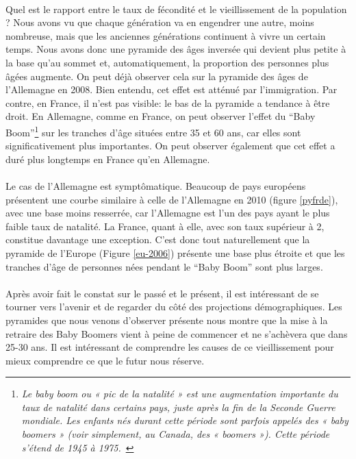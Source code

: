 \paragraph{}Quel est le rapport entre le taux de fécondité et le vieillissement de la population ? Nous avons vu que chaque génération va en engendrer une autre, moins nombreuse, mais que les anciennes générations continuent à vivre un certain temps. Nous avons donc une pyramide des âges inversée qui devient plus petite à la base qu’au sommet et, automatiquement, la proportion des personnes plus âgées augmente. On peut déjà observer cela sur la pyramide des âges de l’Allemagne en 2008. Bien entendu, cet effet est atténué par l’immigration. Par contre, en France, il n’est pas visible: le bas de la pyramide a tendance à être droit.  En Allemagne, comme en France, on peut observer l’effet du “Baby Boom”\footnote{\textit{Le baby boom ou « pic de la natalité » est une augmentation importante du taux de natalité dans certains pays, juste après la fin de la Seconde Guerre mondiale. Les enfants nés durant cette période sont parfois appelés des « baby boomers » (voir simplement, au Canada, des « boomers »). Cette période s'étend de 1945 à 1975.}~\citep{baby-boom}} sur les tranches d'âge situées entre 35 et 60 ans, car elles sont significativement plus importantes. On peut observer également que cet effet a duré plus longtemps en France qu'en Allemagne.

\paragraph{}Le cas de l’Allemagne est symptômatique. Beaucoup de pays européens présentent une courbe similaire à celle de l’Allemagne en 2010 (figure \ref{pyfrde}), avec une base moins resserrée, car l’Allemagne est l'un des pays ayant le plus faible taux de natalité. La France, quant à elle, avec son taux supérieur à 2, constitue davantage une exception. C’est donc tout naturellement que la pyramide de l’Europe (Figure \ref{eu-2006}) présente une base plus étroite et que les tranches d'âge de personnes nées pendant le “Baby Boom” sont plus larges. 

\paragraph{}Après avoir fait le constat sur le passé et le présent, il est intéressant de se tourner vers l’avenir et de regarder du côté des projections démographiques. Les pyramides que nous venons d’observer présente nous montre que la mise à la retraire des Baby Boomers vient à peine de commencer et ne s’achèvera que dans 25-30 ans. Il est intéressant de comprendre les causes de ce vieillissement pour mieux comprendre ce que le futur nous réserve. 

